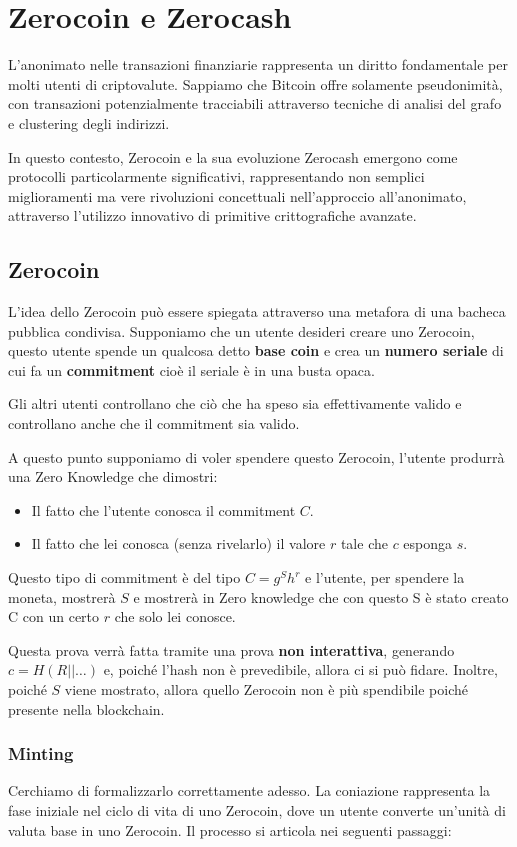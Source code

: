 \chapter{Zerocoin e Zerocash}
L’anonimato nelle transazioni finanziarie rappresenta un diritto fondamentale per molti utenti di criptovalute. Sappiamo che Bitcoin offre solamente pseudonimità, con transazioni potenzialmente tracciabili attraverso tecniche di analisi del grafo e clustering degli indirizzi. 

In questo contesto, Zerocoin e la sua evoluzione Zerocash emergono come protocolli particolarmente significativi, rappresentando non semplici miglioramenti ma vere rivoluzioni concettuali nell’approccio all’anonimato, attraverso l’utilizzo innovativo di primitive crittografiche avanzate.

\section{Zerocoin}
L'idea dello Zerocoin può essere spiegata attraverso una metafora di una bacheca pubblica condivisa. Supponiamo che un utente desideri creare uno Zerocoin, questo utente spende un qualcosa detto \textbf{base coin} e crea un \textbf{numero seriale} di cui fa un \textbf{commitment} cioè il seriale è in una busta opaca. 

Gli altri utenti controllano che ciò che ha speso sia effettivamente valido e controllano anche che il commitment sia valido. 

A questo punto supponiamo di voler spendere questo Zerocoin, l'utente produrrà una Zero Knowledge che dimostri:
\begin{itemize}
    \item Il fatto che l'utente conosca il commitment $C$.
    \item Il fatto che lei conosca (senza rivelarlo) il valore $r$ tale che $c$ esponga $s$. 
\end{itemize}
Questo tipo di commitment è del tipo $C= g^S h^r$ e l'utente, per spendere la moneta, mostrerà $S$ e mostrerà in Zero knowledge che con questo S è stato creato C con un certo $r$ che solo lei conosce.

Questa prova verrà fatta tramite una prova \textbf{non interattiva}, generando $c = H(R || \dots)$ e, poiché l'hash non è prevedibile, allora ci si può fidare. Inoltre, poiché $S$ viene mostrato, allora quello Zerocoin non è più spendibile poiché presente nella blockchain.

\subsection{Minting}
Cerchiamo di formalizzarlo correttamente adesso. La coniazione rappresenta la fase iniziale nel ciclo di vita di uno Zerocoin, dove un utente converte un'unità di valuta base in uno Zerocoin. Il processo si articola nei seguenti passaggi:

